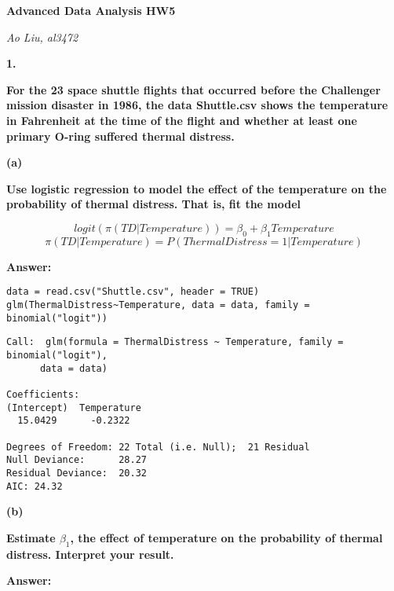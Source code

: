 \documentclass[letterpaper,11pt]{article}
\begin{document}
\begin{center}
	\textbf{\Huge{Advanced Data Analysis HW5}}
\end{center}

\begin{center}
	\textsl{Ao Liu, al3472}
\end{center}

\bigbreak
\bigbreak
\bigbreak



\begin{addmargin}[-2em]{0em}
  \large{\textbf{1. }}
\end{addmargin}
\textbf{For the 23 space shuttle flights that occurred before the Challenger mission disaster in 1986, the data Shuttle.csv shows the temperature in Fahrenheit at the time of the flight and whether at least one primary O-ring suffered thermal distress.}\par

\begin{addmargin}[-1.1em]{0em}
  \textbf{(a)}\par
\end{addmargin}
\textbf{Use logistic regression to model the effect of the temperature on the probability of thermal distress. That is, fit the model}\par
$$logit(\pi(TD\vert Temperature)) = \beta_0 + \beta_1Temperature$$
$$\pi(TD\vert Temperature) = P(Thermal Distress = 1\vert Temperature)$$
\bigbreak
\begin{addmargin}[-0.5em]{0em}
  \textbf{Answer: }
\end{addmargin}

\begin{lstlisting}
data = read.csv("Shuttle.csv", header = TRUE)
glm(ThermalDistress~Temperature, data = data, family = binomial("logit"))
\end{lstlisting}

\begin{lstlisting}
Call:  glm(formula = ThermalDistress ~ Temperature, family = binomial("logit"),
      data = data)

Coefficients:
(Intercept)  Temperature
  15.0429      -0.2322

Degrees of Freedom: 22 Total (i.e. Null);  21 Residual
Null Deviance:	    28.27
Residual Deviance:  20.32
AIC: 24.32
\end{lstlisting}


\begin{addmargin}[-1.1em]{0em}
  \textbf{(b)}\par
\end{addmargin}
\textbf{Estimate $\beta_1$, the effect of temperature on the probability of thermal distress. Interpret your result.}\par
\bigbreak
\begin{addmargin}[-0.5em]{0em}
  \textbf{Answer: }
\end{addmargin}
\end{document}
